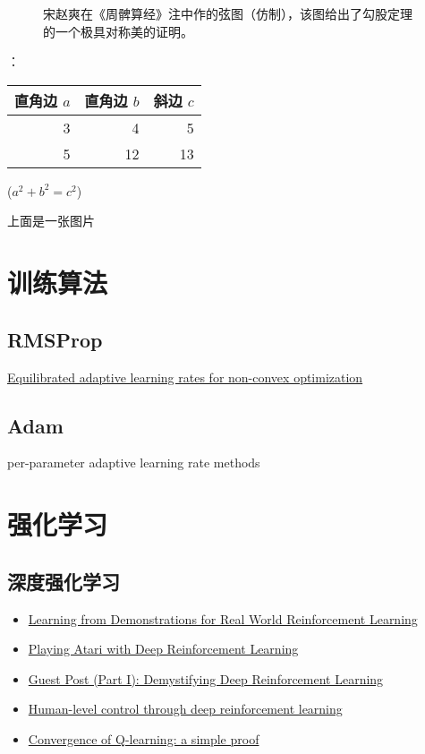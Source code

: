 \documentclass[UTF8,10pt,a4paper]{ctexbook}
\begin{document}
\begin{figure}[ht]
\centering
\caption{宋赵爽在《周髀算经》注中作的弦图（仿制），该图给出了勾股定理的一个极具对称美的证明。} 
\label{fig:cnn}
\end{figure}：

\begin{table}[H]
\begin{tabular}{|rrr|}
\hline
直角边 $a$ & 直角边 $b$ & 斜边 $c$\\
\hline
3 & 4 & 5 \\
5 & 12 & 13 \\
\hline
\end{tabular}%
\qquad
($a^2 + b^2 = c^2$)
\end{table}

上面是一张图片

\section{训练算法}

\subsection{RMSProp}
\href{https://arxiv.org/abs/1502.04390}{Equilibrated adaptive learning rates for non-convex optimization}

\subsection{Adam}
per-parameter adaptive learning rate methods


\section{强化学习}

\subsection{深度强化学习}
\begin{itemize}
\item \href{https://arxiv.org/pdf/1704.03732.pdf}{Learning from Demonstrations for Real World Reinforcement Learning}
\item \href{https://arxiv.org/abs/1312.5602}{Playing Atari with Deep Reinforcement Learning}
\item \href{https://www.intelnervana.com/demystifying-deep-reinforcement-learning/}{Guest Post (Part I): Demystifying Deep Reinforcement Learning}
\item \href{https://storage.googleapis.com/deepmind-media/dqn/DQNNaturePaper.pdf}{Human-level control through deep reinforcement learning}
\item \href{http://simplecore-dev.intel.com/nervana/wp-content/uploads/sites/55/2015/12/ProofQlearning.pdf}{Convergence of Q-learning: a simple proof}
\end{itemize}
\end{document}
